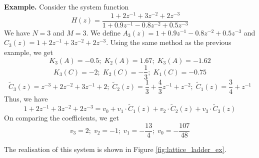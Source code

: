 \documentclass{article}
\theoremstyle{definition}
\begin{document}
\textbf{Example.} Consider the system function 
\[
    H(z) = \frac{1 + 2z^{-1} + 3z^{-2} + 2z^{-3}}{1 + 0.9z^{-1} - 0.8z^{-2} + 0.5z^{-3}}
\]
We have $N=3$ and $M=3$. We define $A_3(z) = 1 + 0.9z^{-1} - 0.8z^{-2} + 0.5z^{-3}$ and $C_3(z) =  1 + 2z^{-1} + 3z^{-2} + 2z^{-3}$. Using the same method as the previous example, we get 
\[
    \boxed{K_3(A) = -0.5; \; K_2(A) = 1.67; \; K_3(A) = -1.62}
\]
\[  
    K_3(C) = -2; \; K_2(C) = - \frac{1}{3}; \; K_1(C) = -0.75
\]
\[
    \widetilde{C}_{3}(z) = z^{-3} + 2z^{-2} + 3z^{-1} + 2; \; \widetilde{C}_{2}(z) = \frac{1}{3} + \frac{4}{3} z^{-1} + z^{-2}; \; \widetilde{C}_{1}(z) = \frac{3}{4} + z^{-1}
\]
Thus, we have 
\[
    1 + 2z^{-1} + 3z^{-2} + 2z^{-3} = v_0 + v_1 \cdot \widetilde{C}_{1}(z) + v_2 \cdot \widetilde{C}_{2}(z) + v_3 \cdot \widetilde{C}_{3}(z)
\]
On comparing the coefficients, we get 
\[
    \boxed{v_3 = 2; \; v_2 = -1; \; v_1 = - \frac{13}{4}; \; v_0 = - \frac{107}{48}}
\]

The realisation of this system is shown in Figure \ref{fig:lattice_ladder_ex}.
\end{document}
